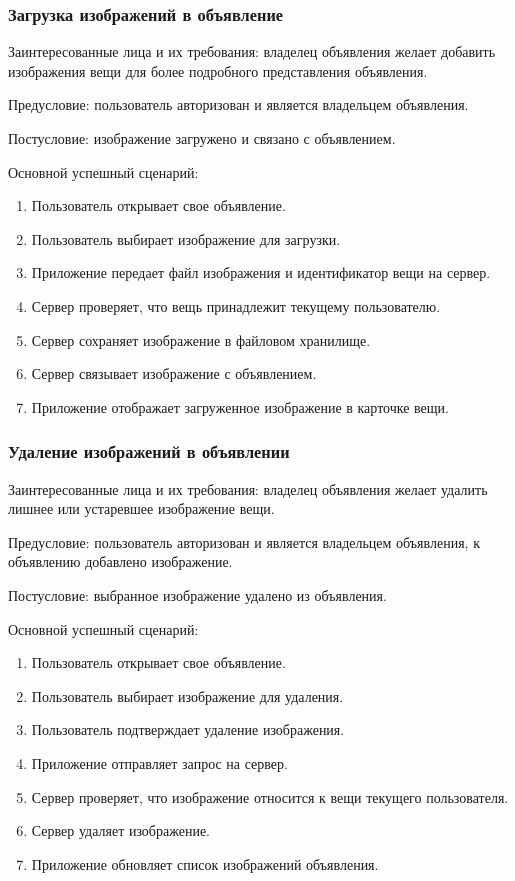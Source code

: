 \subsubsection{Загрузка изображений в объявление}
Заинтересованные лица и их требования: владелец объявления желает добавить изображения вещи для более подробного представления объявления.

Предусловие: пользователь авторизован и является владельцем объявления.

Постусловие: изображение загружено и связано с объявлением.

Основной успешный сценарий:
\begin{enumerate}
    \item Пользователь открывает свое объявление.
    \item Пользователь выбирает изображение для загрузки.
    \item Приложение передает файл изображения и идентификатор вещи на сервер.
    \item Сервер проверяет, что вещь принадлежит текущему пользователю.
    \item Сервер сохраняет изображение в файловом хранилище.
    \item Сервер связывает изображение с объявлением.
    \item Приложение отображает загруженное изображение в карточке вещи.
\end{enumerate}
\subsubsection{Удаление изображений в объявлении}
Заинтересованные лица и их требования: владелец объявления желает удалить лишнее или устаревшее изображение вещи.

Предусловие: пользователь авторизован и является владельцем объявления, к объявлению добавлено изображение.

Постусловие: выбранное изображение удалено из объявления.

Основной успешный сценарий:
\begin{enumerate}
    \item Пользователь открывает свое объявление.
    \item Пользователь выбирает изображение для удаления.
    \item Пользователь подтверждает удаление изображения.
    \item Приложение отправляет запрос на сервер.
    \item Сервер проверяет, что изображение относится к вещи текущего пользователя.
    \item Сервер удаляет изображение.
    \item Приложение обновляет список изображений объявления.
\end{enumerate}

